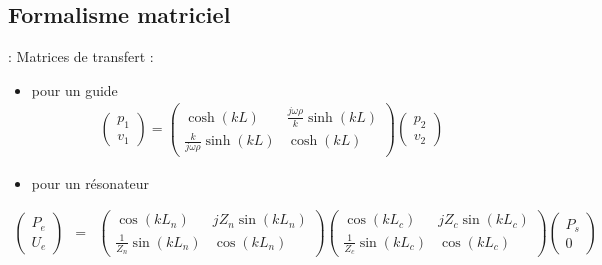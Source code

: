 \documentclass[12pt,xcolor=x11names,compress, notes=show]{beamer}%
\begin{document}
\subsection{Formalisme matriciel}
\begin{frame}{\insertsectionhead : \insertsubsectionhead }
Matrices de transfert : 
\begin{itemize}
	\item pour un guide 
	\begin{eqnarray*}
	\begin{pmatrix} p_1 \\ v_1 \end{pmatrix} = \begin{pmatrix} \cosh(kL) & \frac{j\omega\rho}{k} \sinh(k L) \\  \frac{k}{j\omega\rho}\sinh(k L) & \cosh(k L) 		\end{pmatrix} 	\begin{pmatrix} p_2 \\ v_2 \end{pmatrix}
	\end{eqnarray*}
	
	\item pour un résonateur
\end{itemize}

\begin{footnotesize}
		\begin{eqnarray*}
\begin{pmatrix} P_e \\U_e \end{pmatrix}&=&\begin{pmatrix} \cos(k L_n) & j Z_{n} \sin(k L_n) \\ \frac{1}{Z_{n}} 						\sin(k L_n) & \cos(k L_n) \end{pmatrix} \begin{pmatrix} \cos(k L_c) & j Z_{c} \sin(k L_c) \\ \frac{1}{Z_{c}} \sin(k 				L_c) & \cos(k L_c) \end{pmatrix} \begin{pmatrix} P_s \\ 0  \end{pmatrix}
		\end{eqnarray*}
\end{footnotesize}

\end{frame}
\end{document}
